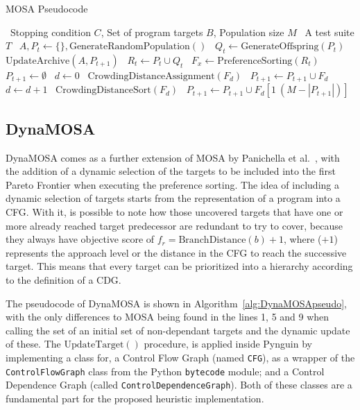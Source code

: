 \documentclass[%
  chapterprefix=false,%
  open=right,%
  twoside=true,%
  paper=a4,%
  logofile={Figures/logo.png},%
  thesistype=master,%
  UKenglish,%
]{se2thesis}
\newcommand{\classname}[1]{\texttt{#1}}
\begin{document}
\algrenewcommand{}
\algrenewcommand{}


\begin{algorithm}[h!]
  \centering
  \caption{MOSA Pseudocode}\label{alg:MOSApseudo}
  \begin{algorithmic}[1]
    \Require~Stopping condition \(C\), Set of program targets \(B\), Population size \(M\)
    \Ensure~A test suite \(T\)
    \State~\(A, P_t \gets \{\}, \text{GenerateRandomPopulation}()\) 
      \State~\(Q_t \gets \text{GenerateOffspring}(P_t)\)
      \State~\(\text{UpdateArchive}(A, P_{t+1})\)
      \State~\(R_t \gets P_t \cup Q_t\)
      \State~\(F_x \gets \text{PreferenceSorting}(R_t)\)
      \State~\(P_{t+1} \gets \emptyset \)
      \State~\(d \gets 0\)
        \State~\(\text{CrowdingDistanceAssignment}(F_d)\)
        \State~\(P_{t+1} \gets P_{t+1} \cup F_d\)
        \State~\(d \gets d + 1\)
      \EndWhile\@
      \State~\(\text{CrowdingDistanceSort}(F_d)\)
      \State~\(P_{t+1} \gets P_{t+1} \cup F_d[1\: (M - |P_{t+1}|)]\)
    \EndWhile\@
  \end{algorithmic}
\end{algorithm}

\newpage

\subsection{DynaMOSA}\label{sec:dynamosa}

DynaMOSA comes as a further extension of MOSA by Panichella et al.~\cite{DBLP:journals/tse/PanichellaKT18}, with the addition of a dynamic selection of the targets to be included into the first Pareto Frontier when executing the preference sorting.
The idea of including a dynamic selection of targets starts from the representation of a program into a CFG.\@
With it, is possible to note how those uncovered targets that have one or more already reached target predecessor are redundant to try to cover, because they always have objective score of \(f_r = \text{BranchDistance}(b) + 1\), where (\(+1\)) represents the approach level or the distance in the CFG to reach the successive target.
This means that every target can be prioritized into a hierarchy according to the definition of a CDG.\@

The pseudocode of DynaMOSA is shown in Algorithm~\ref{alg:DynaMOSApseudo}, with the only differences to MOSA being found in the lines 1, 5 and 9 when calling the set of an initial set of non-dependant targets and the dynamic update of these.
The \(\text{UpdateTarget}()\) procedure, is applied inside Pynguin by implementing a class for, a Control Flow Graph (named \classname{CFG}), as a wrapper of the \classname{ControlFlowGraph} class from the Python \classname{bytecode} module; and a Control Dependence Graph (called \classname{ControlDependenceGraph}).
Both of these classes are a fundamental part for the proposed heuristic implementation.
\end{document}
